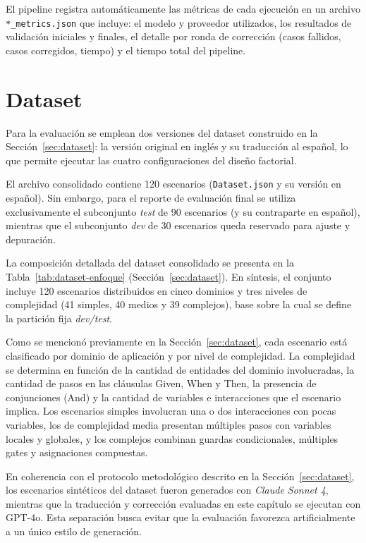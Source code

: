 El pipeline registra automáticamente las métricas de cada ejecución en un archivo \texttt{*\_metrics.json} que incluye: el modelo y proveedor utilizados, los resultados de validación iniciales y finales, el detalle por ronda de corrección (casos fallidos, casos corregidos, tiempo) y el tiempo total del pipeline.

\section{Dataset}

Para la evaluación se emplean dos versiones del dataset construido en la Sección~\ref{sec:dataset}: la versión original en inglés y su traducción al español, lo que permite ejecutar las cuatro configuraciones del diseño factorial.

El archivo consolidado contiene 120 escenarios (\texttt{Dataset.json} y su versión en español). Sin embargo, para el reporte de evaluación final se utiliza exclusivamente el subconjunto \textit{test} de 90 escenarios (y su contraparte en español), mientras que el subconjunto \textit{dev} de 30 escenarios queda reservado para ajuste y depuración.

La composición detallada del dataset consolidado se presenta en la Tabla~\ref{tab:dataset-enfoque} (Sección~\ref{sec:dataset}). En síntesis, el conjunto incluye 120 escenarios distribuidos en cinco dominios y tres niveles de complejidad (41 simples, 40 medios y 39 complejos), base sobre la cual se define la partición fija \textit{dev/test}.

Como se mencionó previamente en la Sección~\ref{sec:dataset}, cada escenario está clasificado por dominio de aplicación y por nivel de complejidad. La complejidad se determina en función de la cantidad de entidades del dominio involucradas, la cantidad de pasos en las cláusulas Given, When y Then, la presencia de conjunciones (And) y la cantidad de variables e interacciones que el escenario implica. Los escenarios simples involucran una o dos interacciones con pocas variables, los de complejidad media presentan múltiples pasos con variables locales y globales, y los complejos combinan guardas condicionales, múltiples gates y asignaciones compuestas.

En coherencia con el protocolo metodológico descrito en la Sección~\ref{sec:dataset}, los escenarios sintéticos del dataset fueron generados con \textit{Claude Sonnet 4}, mientras que la traducción y corrección evaluadas en este capítulo se ejecutan con GPT-4o. Esta separación busca evitar que la evaluación favorezca artificialmente a un único estilo de generación.


